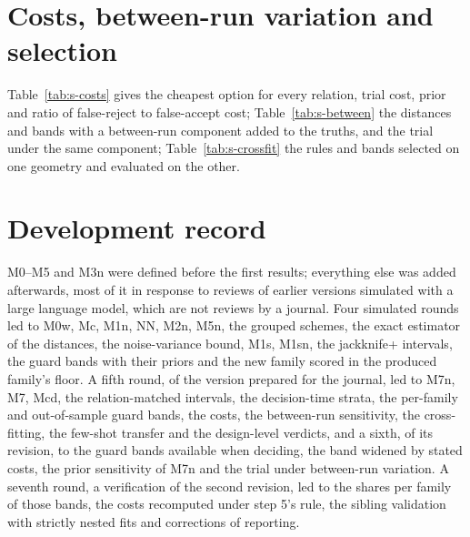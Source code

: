 \documentclass[pdflatex,sn-basic]{sn-jnl}
\begin{document}
\section{Costs, between-run variation and selection}

Table~\ref{tab:s-costs} gives the cheapest option for every relation, trial cost, prior and ratio of false-reject to false-accept cost; Table~\ref{tab:s-between} the distances and bands with a between-run component added to the truths, and the trial under the same component; Table~\ref{tab:s-crossfit} the rules and bands selected on one geometry and evaluated on the other.

\section{Development record}

M0--M5 and M3n were defined before the first results; everything else was added afterwards, most of it in response to reviews of earlier versions simulated with a large language model, which are not reviews by a journal. Four simulated rounds led to M0w, Mc, M1n, NN, M2n, M5n, the grouped schemes, the exact estimator of the distances, the noise-variance bound, M1s, M1sn, the jackknife+ intervals, the guard bands with their priors and the new family scored in the produced family's floor. A fifth round, of the version prepared for the journal, led to M7n, M7, Mcd, the relation-matched intervals, the decision-time strata, the per-family and out-of-sample guard bands, the costs, the between-run sensitivity, the cross-fitting, the few-shot transfer and the design-level verdicts, and a sixth, of its revision, to the guard bands available when deciding, the band widened by stated costs, the prior sensitivity of M7n and the trial under between-run variation. A seventh round, a verification of the second revision, led to the shares per family of those bands, the costs recomputed under step 5's rule, the sibling validation with strictly nested fits and corrections of reporting.

\FloatBarrier
\end{document}
